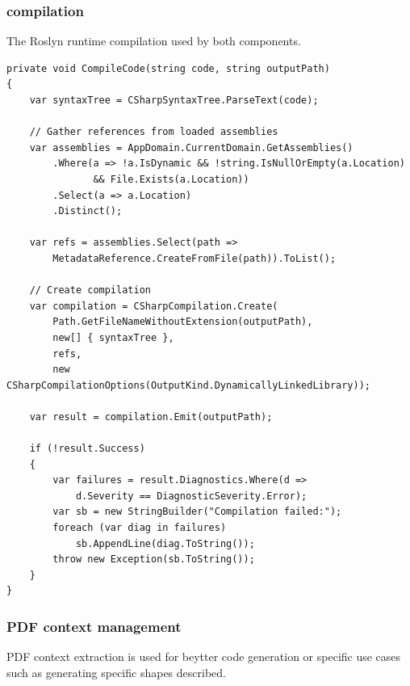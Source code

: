 \subsubsection{compilation}

The Roslyn runtime compilation used by both components.

\begin{verbatim}
private void CompileCode(string code, string outputPath)
{
    var syntaxTree = CSharpSyntaxTree.ParseText(code);
    
    // Gather references from loaded assemblies
    var assemblies = AppDomain.CurrentDomain.GetAssemblies()
        .Where(a => !a.IsDynamic && !string.IsNullOrEmpty(a.Location) 
               && File.Exists(a.Location))
        .Select(a => a.Location)
        .Distinct();
        
    var refs = assemblies.Select(path => 
        MetadataReference.CreateFromFile(path)).ToList();
    
    // Create compilation
    var compilation = CSharpCompilation.Create(
        Path.GetFileNameWithoutExtension(outputPath),
        new[] { syntaxTree },
        refs,
        new CSharpCompilationOptions(OutputKind.DynamicallyLinkedLibrary));
        
    var result = compilation.Emit(outputPath);
    
    if (!result.Success)
    {
        var failures = result.Diagnostics.Where(d => 
            d.Severity == DiagnosticSeverity.Error);
        var sb = new StringBuilder("Compilation failed:");
        foreach (var diag in failures)
            sb.AppendLine(diag.ToString());
        throw new Exception(sb.ToString());
    }
}
\end{verbatim}

\subsubsection{PDF context management}

PDF context extraction is used for beytter code generation or specific use cases such as generating specific shapes described.

